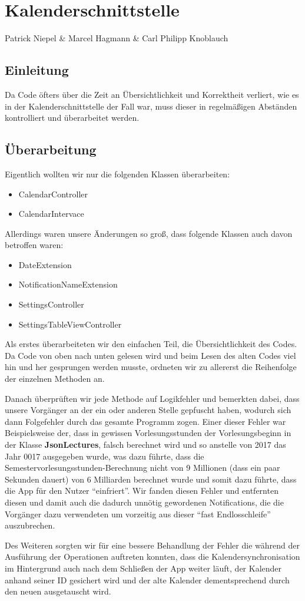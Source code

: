 \chapter{Kalenderschnittstelle}
Patrick Niepel \& Marcel Hagmann \& Carl Philipp Knoblauch

\section{Einleitung}
Da Code öfters über die Zeit an Übersichtlichkeit und Korrektheit verliert, wie es in der Kalenderschnittstelle der Fall war, muss dieser in regelmäßigen Abständen kontrolliert und überarbeitet werden.

\section{Überarbeitung}
Eigentlich wollten wir nur die folgenden Klassen überarbeiten:
\begin{itemize}
\item CalendarController
\item CalendarIntervace
\end{itemize}

Allerdings waren unsere Änderungen so groß, dass folgende Klassen auch davon betroffen waren:
\begin{itemize}
\item DateExtension
\item NotificationNameExtension
\item SettingsController
\item SettingsTableViewController
\end{itemize}

Als erstes überarbeiteten wir den einfachen Teil, die Übersichtlichkeit des Codes. Da Code von oben nach unten gelesen wird und beim Lesen des alten Codes viel hin und her gesprungen werden musste, ordneten wir zu allererst die Reihenfolge der einzelnen Methoden an.

Danach überprüften wir jede Methode auf Logikfehler und bemerkten dabei, dass unsere Vorgänger an der ein oder anderen Stelle gepfuscht haben, wodurch sich dann Folgefehler durch das gesamte Programm zogen.
Einer dieser Fehler war Beispielsweise der, dass in gewissen Vorlesungsstunden der Vorlesungsbeginn in der Klasse \textbf{JsonLectures}, falsch berechnet wird und so anstelle von 2017 das Jahr 0017 ausgegeben wurde, was dazu führte, dass die Semestervorlesungsstunden-Berechnung nicht von 9 Millionen (dass ein paar Sekunden dauert) von 6 Milliarden berechnet wurde und somit dazu führte, dass die App für den Nutzer “einfriert”.
Wir fanden diesen Fehler und entfernten diesen und damit auch die dadurch unnötig gewordenen Notifications, die die Vorgänger dazu verwendeten um vorzeitig aus dieser “fast Endlosschleife” auszubrechen.

Des Weiteren sorgten wir für eine bessere Behandlung der Fehler die während der Ausführung der Operationen auftreten konnten, dass die Kalendersynchronisation im Hintergrund auch nach dem Schließen der App weiter läuft, der Kalender anhand seiner ID gesichert wird und der alte Kalender dementsprechend durch den neuen ausgetauscht wird.
